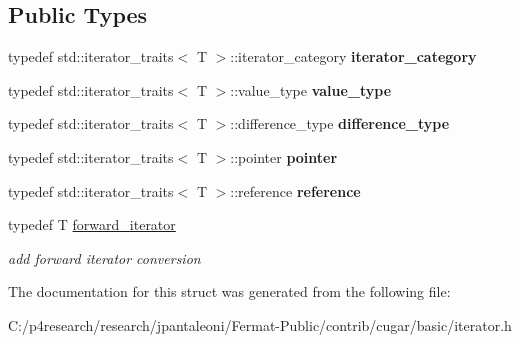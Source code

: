 \subsection*{Public Types}
\begin{DoxyCompactItemize}
\item 
\mbox{\label{structcugar_1_1iterator__traits_ae7fc0f47119fb6d6f00bb3ac797322b0}} 
typedef std\+::iterator\+\_\+traits$<$ T $>$\+::iterator\+\_\+category {\bfseries iterator\+\_\+category}
\item 
\mbox{\label{structcugar_1_1iterator__traits_a4e4346cb857d02a6ce0f14a8ac849972}} 
typedef std\+::iterator\+\_\+traits$<$ T $>$\+::value\+\_\+type {\bfseries value\+\_\+type}
\item 
\mbox{\label{structcugar_1_1iterator__traits_ac053bf36496a8a517d3bcf2acf331180}} 
typedef std\+::iterator\+\_\+traits$<$ T $>$\+::difference\+\_\+type {\bfseries difference\+\_\+type}
\item 
\mbox{\label{structcugar_1_1iterator__traits_ad7145890da0f61dd8f6b8fd3bd7c10a8}} 
typedef std\+::iterator\+\_\+traits$<$ T $>$\+::pointer {\bfseries pointer}
\item 
\mbox{\label{structcugar_1_1iterator__traits_a2fc1e816ad073ae733753a85aa4b26fc}} 
typedef std\+::iterator\+\_\+traits$<$ T $>$\+::reference {\bfseries reference}
\item 
\mbox{\label{structcugar_1_1iterator__traits_aea69e7caa1460e91ad47b0a2573da84d}} 
typedef T \hyperlink{structcugar_1_1iterator__traits_aea69e7caa1460e91ad47b0a2573da84d}{forward\+\_\+iterator}
\begin{DoxyCompactList}\small\item\em add forward iterator conversion \end{DoxyCompactList}\end{DoxyCompactItemize}


The documentation for this struct was generated from the following file\+:\begin{DoxyCompactItemize}
\item 
C\+:/p4research/research/jpantaleoni/\+Fermat-\/\+Public/contrib/cugar/basic/iterator.\+h\end{DoxyCompactItemize}
